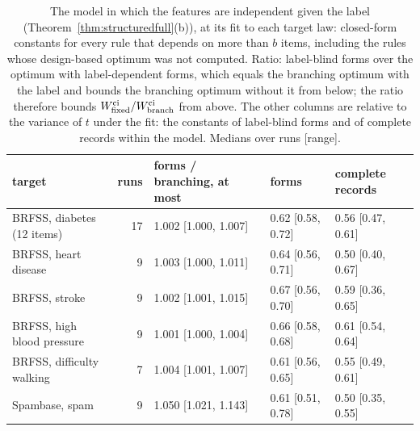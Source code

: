 \begin{table}[h]
\centering
\caption{The model in which the features are independent given the label (Theorem~\ref{thm:structuredfull}(b)), at its fit to each target law: closed-form constants for every rule that depends on more than $b$ items, including the rules whose design-based optimum was not computed. Ratio: label-blind forms over the optimum with label-dependent forms, which equals the branching optimum with the label and bounds the branching optimum without it from below; the ratio therefore bounds $W^{\rm ci}_{\rm fixed}/W^{\rm ci}_{\rm branch}$ from above. The other columns are relative to the variance of $t$ under the fit: the constants of label-blind forms and of complete records within the model. Medians over runs [range].}
\label{tab:ci}
\footnotesize
\setlength{\tabcolsep}{5pt}
\begin{tabular}{lrlll}
\toprule
target & runs & forms / branching, at most & forms & complete records \\
\midrule
BRFSS, diabetes (12 items) & 17 & 1.002 [1.000, 1.007] & 0.62 [0.58, 0.72] & 0.56 [0.47, 0.61] \\
BRFSS, heart disease & 9 & 1.003 [1.000, 1.011] & 0.64 [0.56, 0.71] & 0.50 [0.40, 0.67] \\
BRFSS, stroke & 9 & 1.002 [1.001, 1.015] & 0.67 [0.56, 0.70] & 0.59 [0.36, 0.65] \\
BRFSS, high blood pressure & 9 & 1.001 [1.000, 1.004] & 0.66 [0.58, 0.68] & 0.61 [0.54, 0.64] \\
BRFSS, difficulty walking & 7 & 1.004 [1.001, 1.007] & 0.61 [0.56, 0.65] & 0.55 [0.49, 0.61] \\
Spambase, spam & 9 & 1.050 [1.021, 1.143] & 0.61 [0.51, 0.78] & 0.50 [0.35, 0.55] \\
\bottomrule
\end{tabular}
\end{table}

